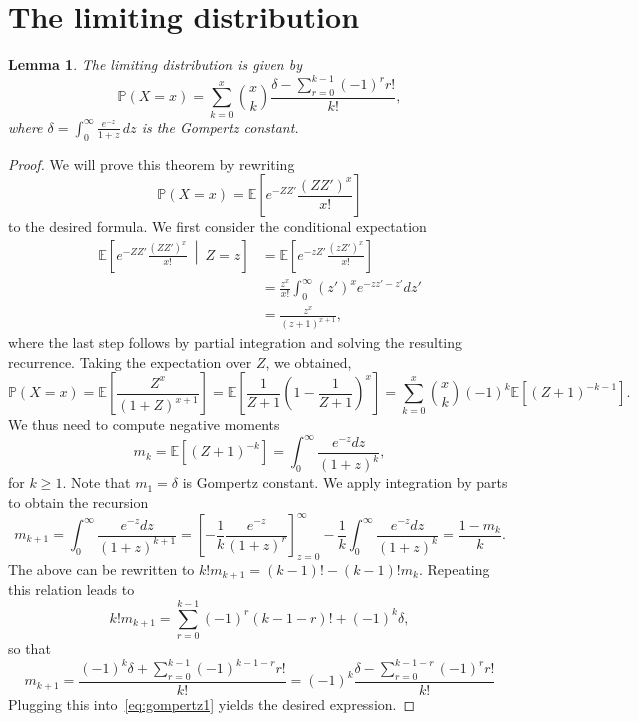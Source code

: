 \documentclass[11pt]{article}
\newtheorem{lemma}[theorem]{Lemma}
\theoremstyle{definition}
\theoremstyle{remark}
\theoremstyle{remark}
\numberwithin{theorem}{section}
\providecommand{\P}{}
\renewcommand{\P}{\mathbb{P}}
\newcommand{\E}{\mathbb{E}}
\begin{document}
\section{The limiting distribution}
\begin{lemma}\label{lem:gompertz}
    The limiting distribution is given by
    \[
    \P(X=x)=\sum_{k=0}^x{x\choose k}\frac{\delta-\sum_{r=0}^{k-1}(-1)^rr!}{k!},
    \]
    where $\delta=\int_{0}^{\infty}\frac{e^{-z}}{1+z}\,dz$ is the \emph{Gompertz} constant.
\end{lemma}
\begin{proof}
    We will prove this theorem by rewriting
    \[
    \P(X=x)=\E\left[e^{-ZZ'}\frac{(ZZ')^x}{x!}\right]
    \]
    to the desired formula. We first consider the conditional expectation
    \begin{align*}
    \E\left[e^{-ZZ'}\frac{(ZZ')^x}{x!}\ \middle|\ Z=z\right]
    &=\E\left[e^{-zZ'}\frac{(zZ')^x}{x!}\right]\\
    &=\frac{z^x}{x!}\int_0^\infty (z')^xe^{-zz'-z'}dz'\\
    &=\frac{z^x}{(z+1)^{x+1}},
    \end{align*}
    where the last step follows by partial integration and solving the resulting recurrence.
    Taking the expectation over $Z$, we obtained,
    \begin{equation}\label{eq:gompertz1}
    \P(X=x)=\E\left[\frac{Z^x}{(1+Z)^{x+1}}\right]=\E\left[\frac1{Z+1}\left(1-\frac1{Z+1}\right)^x\right]=\sum_{k=0}^x{x\choose k}(-1)^k\E\left[(Z+1)^{-k-1}\right].
    \end{equation}
    We thus need to compute negative moments
    \[
    m_k=\E\left[(Z+1)^{-k}\right]=\int_0^\infty\frac{e^{-z}dz}{(1+z)^k},
    \]
    for $k\ge1.$ Note that $m_1=\delta$ is Gompertz constant.
    We apply integration by parts to obtain the recursion
    \[
    m_{k+1}=\int_0^\infty\frac{e^{-z}dz}{(1+z)^{k+1}}=\left[-\frac1k\frac{e^{-z}}{(1+z)^r}\right]_{z=0}^\infty-\frac1k\int_0^\infty\frac{e^{-z}dz}{(1+z)^k}=\frac{1-m_k}{k}.
    \]
    The above can be rewritten to $k!m_{k+1}=(k-1)!-(k-1)!m_k$. Repeating this relation leads to
    \[
    k!m_{k+1}=\sum_{r=0}^{k-1}(-1)^r(k-1-r)!+(-1)^k\delta,
    \]
    so that
    \[
    m_{k+1}=\frac{(-1)^k\delta+\sum_{r=0}^{k-1}(-1)^{k-1-r}r!}{k!}=(-1)^k\frac{\delta-\sum_{r=0}^{k-1-r}(-1)^{r}r!}{k!}
    \]
    Plugging this into~\eqref{eq:gompertz1} yields the desired expression.
\end{proof}
\end{document}
